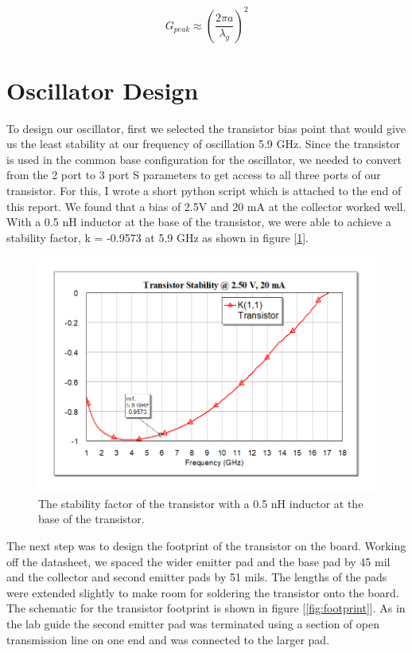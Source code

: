\documentclass{article}
\begin{document}
\begin{equation}
G_{peak} \approx \left(\frac{2 \pi a}{\lambda_g}\right)^2
\label{eqn:can}
\end{equation}

\section*{Oscillator Design}\label{sec:oscdesign}

To design our oscillator, first we selected the transistor bias point that would give us the least stability at our frequency of oscillation 5.9 GHz. Since the transistor is used in the common base configuration for the oscillator, we needed to convert from the 2 port to 3 port S parameters to get access to all three ports of our transistor. For this, I wrote a short python script which is attached to the end of this report. We found that a bias of 2.5V and 20 mA at the collector worked well. With a 0.5 nH inductor at the base of the transistor, we were able to achieve a stability factor, k = -0.9573 at 5.9 GHz as shown in figure [\ref{fig:inductor_base}]. 

\begin{figure}[!htbp]
    \centering
    \includegraphics[scale=0.4]{transistor_stable.png}
    \caption{The stability factor of the transistor with a 0.5 nH inductor at the base of the transistor.}
    \label{fig:inductor_base}
\end{figure}

The next step was to design the footprint of the transistor on the board. Working off the datasheet, we spaced the wider emitter pad and the base pad by 45 mil and the collector and second emitter pads by 51 mils. The lengths of the pads were extended slightly to make room for soldering the transistor onto the board. The schematic for the transistor footprint is shown in figure [\ref{fig:footprint}]. As in the lab guide the second emitter pad was terminated using a section of open transmission line on one end and was connected to the larger pad.
\end{document}
